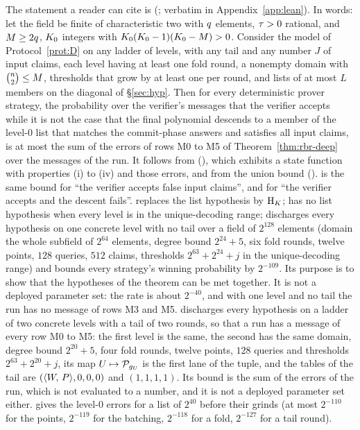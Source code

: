 The statement a reader can cite is  (; verbatim in Appendix~\ref{app:lean}). In words: let the field be finite of characteristic two with $q$ elements, $\tau>0$ rational, and $M\ge2q$, $K_0$ integers with $K_0(K_0-1)(K_0-M)>0$. Consider the model of Protocol~\ref{prot:D} on any ladder of levels, with any tail and any number $J$ of input claims, each level having at least one fold round, a nonempty domain with $\binom{n}{2}\le M$, thresholds that grow by at least one per round, and lists of at most $L$ members on the diagonal of \S\ref{sec:hyp}. Then for every deterministic prover strategy, the probability over the verifier's messages that the verifier accepts while it is not the case that the final polynomial descends to a member of the level-$0$ list that matches the commit-phase answers and satisfies all input claims, is at most the sum of the errors of rows M0 to M5 of Theorem~\ref{thm:rbr-deep} over the messages of the run. It follows from  (), which exhibits a state function with properties (i) to (iv) and those errors, and from the union bound  ().  is the same bound for ``the verifier accepts false input claims'', and  for ``the verifier accepts and the descent fails''.  replaces the list hypothesis by $\mathrm{H}_{K}$;  has no list hypothesis when every level is in the unique-decoding range;  discharges every hypothesis on one concrete level with no tail over a field of $2^{128}$ elements (domain the whole subfield of $2^{64}$ elements, degree bound $2^{24}+5$, six fold rounds, twelve points, $128$ queries, $512$ claims, thresholds $2^{63}+2^{24}+j$ in the unique-decoding range) and bounds every strategy's winning probability by $2^{-109}$. Its purpose is to show that the hypotheses of the theorem can be met together. It is not a deployed parameter set: the rate is about $2^{-40}$, and with one level and no tail the run has no message of rows M3 and M5.  discharges every hypothesis on a ladder of two concrete levels with a tail of two rounds, so that a run has a message of every row M0 to M5: the first level is the same, the second has the same domain, degree bound $2^{20}+5$, four fold rounds, twelve points, $128$ queries and thresholds $2^{63}+2^{20}+j$, its map $U\mapsto\mathcal{P}_{g_U}$ is the first lane of the tuple, and the tables of the tail are $(\langle W,\, P \rangle,0,0,0)$ and $(1,1,1,1)$. Its bound is the sum of the errors of the run, which is not evaluated to a number, and it is not a deployed parameter set either.  gives the level-$0$ errors for a list of $2^{40}$ before their grinds (at most $2^{-110}$ for the points, $2^{-119}$ for the batching, $2^{-118}$ for a fold, $2^{-127}$ for a tail round).

